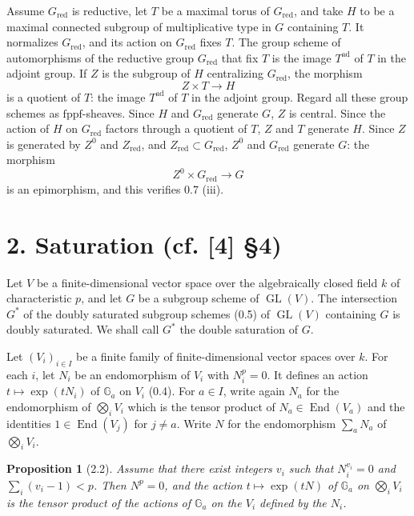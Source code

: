 \documentclass[10pt]{article}
\newcommand{\Ga}{\mathbb G_a}
\newcommand{\GL}{\operatorname{GL}}
\newcommand{\red}{\mathrm{red}}
\newcommand{\End}{\operatorname{End}}
\newcommand{\fppf}{\mathrm{fppf}}
\theoremstyle{deligne}
\newtheorem*{proposition*}{Proposition}
\newcommand{\heading}[1]{\vspace{0.7em}\noindent{\bfseries #1}\quad}
\begin{document}
\heading{1.25. Proof of 0.7 (iii).}
Assume \(G_{\red}\) is reductive, let \(T\) be a maximal torus of \(G_{\red}\), and take \(H\) to be a maximal connected subgroup of multiplicative type in \(G\) containing \(T\). It normalizes \(G_{\red}\), and its action on \(G_{\red}\) fixes \(T\). The group scheme of automorphisms of the reductive group \(G_{\red}\) that fix \(T\) is the image \(T^{\mathrm{ad}}\) of \(T\) in the adjoint group. If \(Z\) is the subgroup of \(H\) centralizing \(G_{\red}\), the morphism
\[
Z\times T\longrightarrow H
\]
is a quotient of \(T\): the image \(T^{\mathrm{ad}}\) of \(T\) in the adjoint group. Regard all these group schemes as \(\fppf\)-sheaves. Since \(H\) and \(G_{\red}\) generate \(G\), \(Z\) is central. Since the action of \(H\) on \(G_{\red}\) factors through a quotient of \(T\), \(Z\) and \(T\) generate \(H\). Since \(Z\) is generated by \(Z^0\) and \(Z_{\red}\), and \(Z_{\red}\subset G_{\red}\), \(Z^0\) and \(G_{\red}\) generate \(G\): the morphism
\[
Z^0\times G_{\red}\longrightarrow G
\]
is an epimorphism, and this verifies 0.7 (iii).

\section*{2. Saturation (cf. [4] \S4)}

\heading{2.1.}
Let \(V\) be a finite-dimensional vector space over the algebraically closed field \(k\) of characteristic \(p\), and let \(G\) be a subgroup scheme of \(\GL(V)\). The intersection \(G^*\) of the doubly saturated subgroup schemes (0.5) of \(\GL(V)\) containing \(G\) is doubly saturated. We shall call \(G^*\) the double saturation of \(G\).

Let \((V_i)_{i\in I}\) be a finite family of finite-dimensional vector spaces over \(k\). For each \(i\), let \(N_i\) be an endomorphism of \(V_i\) with \(N_i^p=0\). It defines an action \(t\mapsto \exp(tN_i)\) of \(\Ga\) on \(V_i\) (0.4). For \(a\in I\), write again \(N_a\) for the endomorphism of \(\bigotimes_i V_i\) which is the tensor product of \(N_a\in\End(V_a)\) and the identities \(1\in\End(V_j)\) for \(j\ne a\). Write \(N\) for the endomorphism \(\sum_a N_a\) of \(\bigotimes_i V_i\).

\begin{proposition*}[2.2]
Assume that there exist integers \(v_i\) such that \(N_i^{v_i}=0\) and \(\sum_i(v_i-1)<p\). Then \(N^p=0\), and the action \(t\mapsto\exp(tN)\) of \(\Ga\) on \(\bigotimes_i V_i\) is the tensor product of the actions of \(\Ga\) on the \(V_i\) defined by the \(N_i\).
\end{proposition*}
\end{document}
